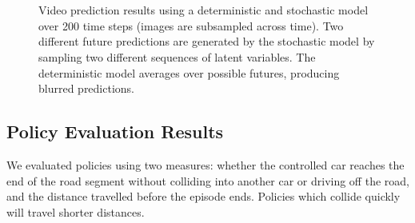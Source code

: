 \documentclass{article} %
\begin{document}
\begin{figure}[t!]
    \centering
     \\
     \\
    \caption{Video prediction results using a deterministic and stochastic model over 200 time steps (images are subsampled across time). Two different future predictions are generated by the stochastic model by sampling two different sequences of latent variables. The deterministic model averages over possible futures, producing blurred predictions.}
    \label{prediction-results}
\end{figure}









    \subsection{Policy Evaluation Results}

    We evaluated policies using two measures: whether the controlled car reaches the end of the road segment without colliding into another car or driving off the road, and the distance travelled before the episode ends. Policies which collide quickly will travel shorter distances.
\end{document}
